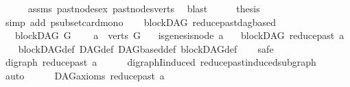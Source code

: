 \begin{isabellebody}
\ \ \ \ \isamarkupfalse%
\ assms{\isacharparenleft}{\kern0pt}{}{\isacharparenright}{\kern0pt}\ past{\isacharunderscore}{\kern0pt}nodes{\isacharunderscore}{\kern0pt}ex\ past{\isacharunderscore}{\kern0pt}nodes{\isacharunderscore}{\kern0pt}verts\ \isamarkupfalse%
\ blast\isanewline
\ \ \isamarkupfalse%
\ \isamarkupfalse%
\ {\isacharquery}{\kern0pt}thesis\isanewline
\ \ \ \ \isamarkupfalse%
\ {\isacharparenleft}{\kern0pt}simp\ add{\isacharcolon}{\kern0pt}\ psubset{\isacharunderscore}{\kern0pt}card{\isacharunderscore}{\kern0pt}mono{\isacharparenright}{\kern0pt}\isanewline
{}\isamarkupfalse%
%
\endisatagproof
{\isafoldproof}%
%
\isadelimproof
\ \isanewline
%
\endisadelimproof
\isanewline
\isanewline
\isanewline
\isanewline
{}\isamarkupfalse%
\ {\isacharparenleft}{\kern0pt}\ blockDAG{\isacharparenright}{\kern0pt}\ reduce{\isacharunderscore}{\kern0pt}past{\isacharunderscore}{\kern0pt}dagbased{\isacharcolon}{\kern0pt}\isanewline
\ \ \ {\isachardoublequoteopen}blockDAG\ G{\isachardoublequoteclose}\isanewline
\ \ \ {\isachardoublequoteopen}\ a\ {\isasymin}\ verts\ G{\isachardoublequoteclose}\isanewline
\ \ \ {\isachardoublequoteopen}{\isasymnot}is{\isacharunderscore}{\kern0pt}genesis{\isacharunderscore}{\kern0pt}node\ a{\isachardoublequoteclose}\isanewline
\ \ \ {\isachardoublequoteopen}blockDAG\ {\isacharparenleft}{\kern0pt}reduce{\isacharunderscore}{\kern0pt}past\ a{\isacharparenright}{\kern0pt}{\isachardoublequoteclose}\isanewline
%
\isadelimproof
\ \ %
\endisadelimproof
%
\isatagproof
{}\isamarkupfalse%
\ blockDAG{\isacharunderscore}{\kern0pt}def\ DAG{\isacharunderscore}{\kern0pt}def\ DAGbased{\isacharunderscore}{\kern0pt}def\ blockDAG{\isacharunderscore}{\kern0pt}def\isanewline
\ \ \isanewline
{}\isamarkupfalse%
\ safe\isanewline
\ \ \isamarkupfalse%
\ {\isachardoublequoteopen}digraph\ {\isacharparenleft}{\kern0pt}reduce{\isacharunderscore}{\kern0pt}past\ a{\isacharparenright}{\kern0pt}{\isachardoublequoteclose}\isanewline
\ \ \ \ \isamarkupfalse%
\ digraphI{\isacharunderscore}{\kern0pt}induced\ reduce{\isacharunderscore}{\kern0pt}past{\isacharunderscore}{\kern0pt}induced{\isacharunderscore}{\kern0pt}subgraph\ \isamarkupfalse%
\ auto\ \ \isanewline
{}\isamarkupfalse%
\isanewline
\ \ \isamarkupfalse%
\ {\isachardoublequoteopen}DAG{\isacharunderscore}{\kern0pt}axioms\ {\isacharparenleft}{\kern0pt}reduce{\isacharunderscore}{\kern0pt}past\ a{\isacharparenright}{\kern0pt}{\isachardoublequoteclose}\isanewline

\end{isabellebody}
